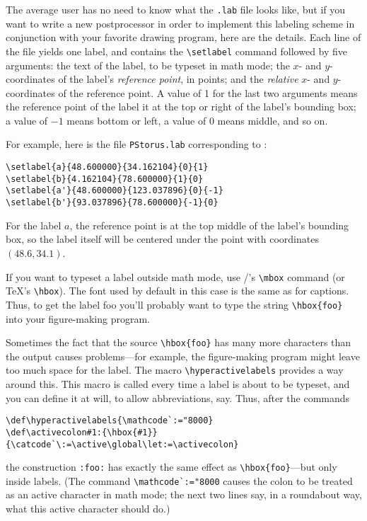 \begin{wizard}
The average user has no need to know what the \verb~.lab~ file looks
like, but if you want to write a new postprocessor in order to
implement this labeling scheme in conjunction with your favorite
drawing program, here are the details.  Each line of the file
yields one label, and contains the \verb+\setlabel+ command
followed by five arguments: the text of the label, to be typeset in
math mode; the $x$- and $y$-coordinates of the label's {\it reference
point}, in points; and the {\it relative} $x$- and $y$-coordinates of
the reference point.  A value of 1 for the last two arguments means
the reference point of the label it at the top or right of the label's
bounding box; a value of $-1$ means bottom or left, a value of $0$
means middle, and so on.

For example, here is the file \verb+PStorus.lab+ corresponding to
:
\begin{verbatim}
\setlabel{a}{48.600000}{34.162104}{0}{1}
\setlabel{b}{4.162104}{78.600000}{1}{0}
\setlabel{a'}{48.600000}{123.037896}{0}{-1}
\setlabel{b'}{93.037896}{78.600000}{-1}{0}
\end{verbatim}
For the label $a$, the reference point is at the top middle of the
label's bounding box, so the label itself will be centered under the
point with coordinates $(48.6,34.1)$.

If you want to typeset a label outside math mode, use \latex/'s
\verb+\mbox+ command (or \TeX's \verb+\hbox+).  The font used by
default in this case is the same as for captions.  Thus, to get the
label {\sf foo} you'll probably want to type the string
\verb+\hbox{foo}+ into your figure-making program.

Sometimes the fact that the source \verb+\hbox{foo}+ has many more
characters than the output causes problems---for example, the
figure-making program might leave too much space for the label.  The
macro \verb+\hyperactivelabels+ provides a way around this.  This
macro is called every time a label is about to be typeset, and you can
define it at will, to allow abbreviations, say.  Thus, after the
commands
\begin{verbatim}
\def\hyperactivelabels{\mathcode`:="8000}
\def\activecolon#1:{\hbox{#1}}
{\catcode`\:=\active\global\let:=\activecolon}
\end{verbatim}
the construction \verb+:foo:+ has exactly the same effect as
\verb+\hbox{foo}+---but only inside labels.  (The command
\verb+\mathcode`:="8000+ causes the colon to be treated as an active
character in math mode; the next two lines say, in a roundabout way,
what this active character should do.)
\end{wizard}

